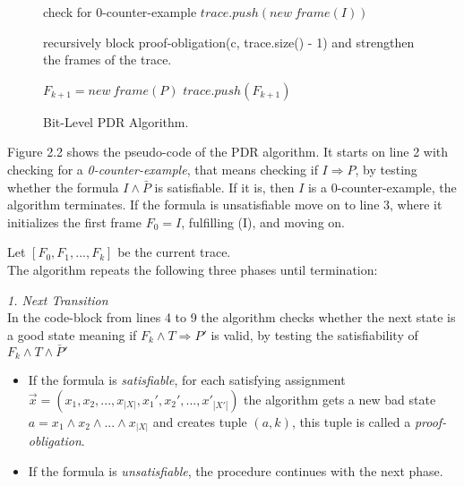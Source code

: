 \documentclass[11pt, a4paper, BCOR=10mm, ngerman]{scrbook}
\begin{document}
\begin{figure}[H]
	\begin{algorithm}[H] 
		\begin{algorithmic}[1]
			\State check for 0-counter-example
			\State $trace.push(new\ frame(I))$
			\Statex
			\Loop
			
			\State recursively block proof-obligation(c, trace.size() - 1)
			\State and strengthen the frames of the trace.
			
			 
			\EndIf
			\EndWhile
			
			\Statex 
			
			\State $F_{k+1} = new\ frame(P)$
			\EndIf
			\EndFor
			\EndIf
			\State $trace.push(F_{k+1})$
			
			\EndLoop
			\EndProcedure
		\end{algorithmic}
	\end{algorithm}
	\caption{Bit-Level PDR Algorithm.}
\end{figure}

Figure 2.2 shows the pseudo-code of the PDR algorithm. It starts on line 2 with checking for a \textsl{0-counter-example}, that means checking if $I \Rightarrow P$, by testing whether the formula $I \land \bar P$ is satisfiable. If it is, then $I$ is a 0-counter-example, the algorithm terminates.
If the formula is unsatisfiable move on to line 3, where it initializes the first frame $F_0 = I$, fulfilling (I), and moving on. \par

Let $[F_0, F_1, ..., F_k]$ be the current trace. \\ 
The algorithm repeats the following three phases until termination: \par

\textsl{1. Next Transition} \\ In the code-block from lines 4 to 9 the algorithm checks whether the next state is a good state meaning if $F_k \land T \Rightarrow P'$ is valid, by testing the satisfiability of $F_k \land T \land \bar P'$ 
\begin{itemize}
\item If the formula is \textsl{satisfiable}, for each satisfying assignment \\ $\vec{x} = (x_1, x_2, ..., x_{|X|}, x_1', x_2', ..., x'_{|X'|})$ the algorithm gets a new bad state \\ $a = x_1 \land x_2 \land ... \land x_{|X|}$ and creates tuple $(a, k)$, this tuple is called a \textsl{proof-obligation}.

\item If the formula is \textsl{unsatisfiable}, the procedure continues with the next phase. \\
\end{itemize}
\end{document}
